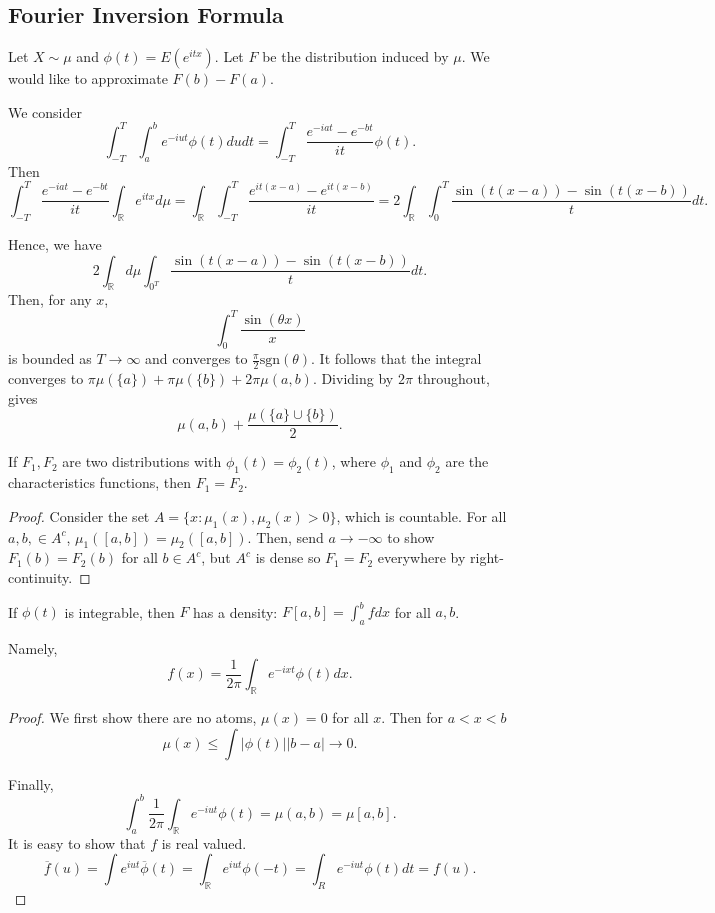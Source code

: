 \documentclass[11pt]{scrartcl}
\newcommand{\R}{\mathbb{R}}
\begin{document}
\subsection{Fourier Inversion Formula}
Let $X \sim \mu$ and $\phi(t) = E(e^{itx})$.  Let $F$ be the distribution induced by $\mu$.  We would like to approximate $F(b) - F(a)$.  

We consider $$\int_{-T}^T\int_{a}^b e^{-iut}\phi(t) du dt = \int_{-T}^T \frac{e^{-iat} - e^{-bt}}{it} \phi(t).$$
Then $$\int_{-T}^T \frac{e^{-iat} - e^{-bt}}{it} \int_\R e^{itx} d\mu= \int_\R \int_{-T}^T \frac{e^{it(x-a)} - e^{it(x-b)}}{it} = 2\int_\R \int_{0}^T \frac{\sin(t(x-a)) - \sin(t(x-b))}{t}dt.$$

Hence, we have 
$$2 \int_{\R}d\mu \int_{0^T} \frac{\sin(t(x-a)) - \sin(t(x-b))}{t}dt.$$
Then, for any $x$, $$\int_{0}^T \frac{\sin (\theta x)}{x} $$ is bounded as $T \rightarrow \infty$ and converges to $\frac{\pi}{2}\text{sgn}(\theta)$. 
It follows that the integral converges to $\pi \mu(\{a\}) + \pi\mu(\{b\}) + 2\pi \mu(a, b)$.  Dividing by $2\pi$ throughout, gives $$\mu(a,b) + \frac{\mu(\{a\} \cup \{b\})}{2}.$$
\begin{lemma} If $F_1, F_2$ are two distributions with $\phi_1(t) = \phi_2(t)$, where $\phi_1$ and $\phi_2$ are the characteristics functions, then $F_1 = F_2$.
\end{lemma}
\begin{proof}
Consider the set $A = \{x : \mu_1(x), \mu_2(x) > 0\}$, which is countable. For all $a, b, \in A^c$, $\mu_1([a, b]) = \mu_2([a, b])$.  Then, send $a \to -\infty$ to show $F_1(b) = F_2(b)$ for all $b \in A^c$, but $A^c$ is dense so $F_1 = F_2$ everywhere by right-continuity.
\end{proof}
\begin{thm}
If $\phi(t)$ is integrable, then $F$ has a density: $F[a, b] = \int_{a}^b f dx$ for all $a, b$.

Namely, $$f(x) = \frac{1}{2\pi}\int_\R e^{-ixt}\phi(t)dx.$$
\end{thm}
\begin{proof}
We first show there are no atoms, $\mu(x) = 0$ for all $x$.   Then for $a < x < b$
$$\mu(x) \le \int |\phi(t)| |b-a| \rightarrow 0.$$

Finally, $$\int_{a}^b\frac{1}{2\pi}\int_\R e^{-iut}\phi(t) = \mu(a, b) = \mu[a, b].$$
It is easy to show that $f$ is real valued. 
$$\overline{f}(u) = \int e^{iut}\overline{\phi}(t) = \int_{\R} e^{iut}\phi(-t) = \int_R e^{-iut}\phi(t)dt = f(u).$$
\end{proof}
\pagebreak
\end{document}
